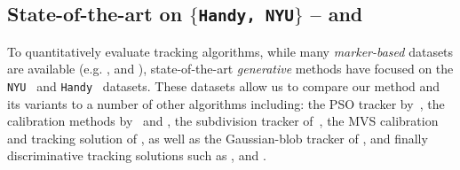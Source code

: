 \subsection{State-of-the-art on $\{$\texttt{Handy, NYU}$\}$ --
 and }
\label{sec:evalstar}
To quantitatively evaluate tracking algorithms, while many \emph{marker-based} datasets are available (e.g. \cite{qian2014realtime}, \cite{sharp2015accurate} and \cite{yuan2017bighand}), 
state-of-the-art \emph{generative} methods have focused on the \texttt{NYU}~\cite{tompson2014real} and \texttt{Handy}~\cite{tkach2016sphere} datasets. These datasets allow us to compare our method and its variants to a number of other algorithms including: the PSO tracker by~\cite{sharp2015accurate}, the calibration methods by~\cite{khamis2015learning} and \cite{tan2016fits}, the subdivision tracker of~\cite{taylor2016joint}, the MVS calibration and tracking solution of \cite{tkach2016sphere}, as well as the Gaussian-blob tracker of \cite{sridhar2015fast}, and finally discriminative tracking solutions such as  \cite{tompson2014real}, \cite{tang2015opening} and \cite{oberweger2015hands}. 


